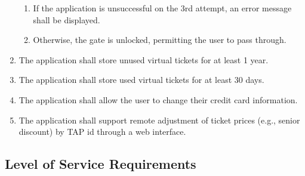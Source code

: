 \begin{enumerate}
\begin{enumerate}
				\item If the application is unsuccessful on the 3rd attempt, an error message shall be displayed.
				\item Otherwise, the gate is unlocked, permitting the user to pass through.
			\end{enumerate}
		\item The application shall store unused virtual tickets for at least 1 year. 
		\item The application shall store used virtual tickets for at least 30 days.
		\item The application shall allow the user to change their credit card information. 
		\item The application shall support remote adjustment of ticket prices (e.g., senior discount) by TAP id through a web interface.
	\end{enumerate}		
\newpage	
\subsection{Level of Service Requirements}

